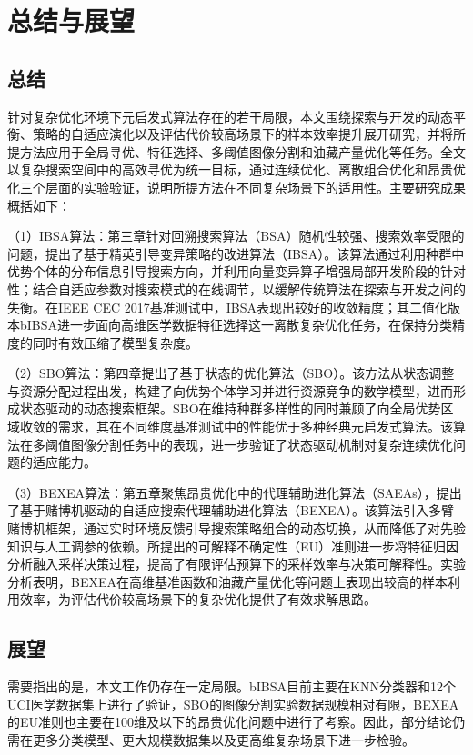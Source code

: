 \chapter{总结与展望}

\section{总结}

针对复杂优化环境下元启发式算法存在的若干局限，本文围绕探索与开发的动态平衡、策略的自适应演化以及评估代价较高场景下的样本效率提升展开研究，并将所提方法应用于全局寻优、特征选择、多阈值图像分割和油藏产量优化等任务。全文以复杂搜索空间中的高效寻优为统一目标，通过连续优化、离散组合优化和昂贵优化三个层面的实验验证，说明所提方法在不同复杂场景下的适用性。主要研究成果概括如下：

（1）IBSA算法：第三章针对回溯搜索算法（BSA）随机性较强、搜索效率受限的问题，提出了基于精英引导变异策略的改进算法（IBSA）。该算法通过利用种群中优势个体的分布信息引导搜索方向，并利用向量变异算子增强局部开发阶段的针对性；结合自适应参数对搜索模式的在线调节，以缓解传统算法在探索与开发之间的失衡。在IEEE CEC 2017基准测试中，IBSA表现出较好的收敛精度；其二值化版本bIBSA进一步面向高维医学数据特征选择这一离散复杂优化任务，在保持分类精度的同时有效压缩了模型复杂度。

（2）SBO算法：第四章提出了基于状态的优化算法（SBO）。该方法从状态调整与资源分配过程出发，构建了向优势个体学习并进行资源竞争的数学模型，进而形成状态驱动的动态搜索框架。SBO在维持种群多样性的同时兼顾了向全局优势区域收敛的需求，其在不同维度基准测试中的性能优于多种经典元启发式算法。该算法在多阈值图像分割任务中的表现，进一步验证了状态驱动机制对复杂连续优化问题的适应能力。

（3）BEXEA算法：第五章聚焦昂贵优化中的代理辅助进化算法（SAEAs），提出了基于赌博机驱动的自适应搜索代理辅助进化算法（BEXEA）。该算法引入多臂赌博机框架，通过实时环境反馈引导搜索策略组合的动态切换，从而降低了对先验知识与人工调参的依赖。所提出的可解释不确定性（EU）准则进一步将特征归因分析融入采样决策过程，提高了有限评估预算下的采样效率与决策可解释性。实验分析表明，BEXEA在高维基准函数和油藏产量优化等问题上表现出较高的样本利用效率，为评估代价较高场景下的复杂优化提供了有效求解思路。

\section{展望}

需要指出的是，本文工作仍存在一定局限。bIBSA目前主要在KNN分类器和12个UCI医学数据集上进行了验证，SBO的图像分割实验数据规模相对有限，BEXEA的EU准则也主要在100维及以下的昂贵优化问题中进行了考察。因此，部分结论仍需在更多分类模型、更大规模数据集以及更高维复杂场景下进一步检验。

